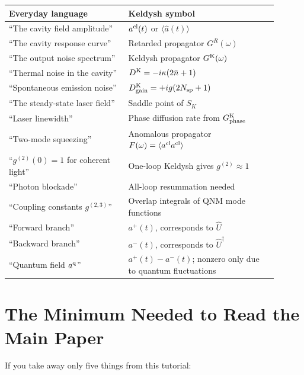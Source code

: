 \documentclass[12pt]{article}
\newcommand{\cl}{{\rm cl}}
\newcommand{\q}{{\rm q}}
\newcommand{\Keldysh}{{\rm K}}
\newcommand{\av}[1]{\langle #1 \rangle}
\providecommand{\cl}{{\rm cl}}
\providecommand{\q}{{\rm q}}
\providecommand{\Keldysh}{{\rm K}}
\begin{document}
\begin{center}
\begin{tabular}{p{0.40\linewidth}p{0.50\linewidth}}
\toprule
Everyday language & Keldysh symbol \\
\midrule
``The cavity field amplitude'' & $a^\cl(t)$ or $\av{\hat{a}(t)}$ \\
``The cavity response curve'' & Retarded propagator $G^R(\omega)$ \\
``The output noise spectrum'' & Keldysh propagator $G^\Keldysh(\omega)$ \\
``Thermal noise in the cavity'' & $D^\Keldysh = -i\kappa(2\bar{n}+1)$ \\
``Spontaneous emission noise'' & $D^\Keldysh_{\rm gain} = +ig(2N_{\rm sp}+1)$ \\
``The steady-state laser field'' & Saddle point of $S_K$ \\
``Laser linewidth'' & Phase diffusion rate from $G^\Keldysh_{\rm phase}$ \\
``Two-mode squeezing'' & Anomalous propagator $F(\omega) = \av{a^\cl a^\cl}$ \\
``$g^{(2)}(0)=1$ for coherent light'' & One-loop Keldysh gives $g^{(2)}\approx 1$ \\
``Photon blockade'' & All-loop resummation needed \\
``Coupling constants $g^{(2,3)}$'' & Overlap integrals of QNM mode functions \\
``Forward branch'' & $a^+(t)$, corresponds to $\hat{U}$ \\
``Backward branch'' & $a^-(t)$, corresponds to $\hat{U}^\dagger$ \\
``Quantum field $a^\q$'' &
  $a^+(t) - a^-(t)$; nonzero only due to quantum fluctuations \\
\bottomrule
\end{tabular}
\end{center}

\section{The Minimum Needed to Read the Main Paper}

If you take away only five things from this tutorial:
\end{document}
